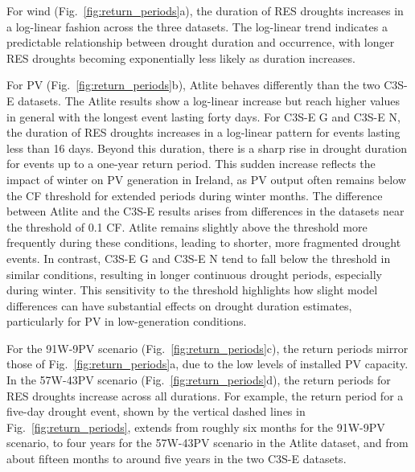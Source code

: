 \documentclass[preprint, 12pt, authoryear]{elsarticle}
\begin{document}
For wind (Fig.~\ref{fig:return_periods}a), the duration of RES droughts increases in a log-linear fashion across the three datasets. The log-linear trend indicates a predictable relationship between drought duration and occurrence, with longer RES droughts becoming exponentially less likely as duration increases. 

For PV (Fig.~\ref{fig:return_periods}b), Atlite behaves differently than the two C3S-E datasets. The Atlite results show a log-linear increase but reach higher values in general with the longest event lasting forty days. For C3S-E G and C3S-E N, the duration of RES droughts increases in a log-linear pattern for events lasting less than 16 days. Beyond this duration, there is a sharp rise in drought duration for events up to a one-year return period. This sudden increase reflects the impact of winter on PV generation in Ireland, as PV output often remains below the CF threshold for extended periods during winter months. The difference between Atlite and the C3S-E results arises from differences in the datasets near the threshold of 0.1 CF. Atlite remains slightly above the threshold more frequently during these conditions, leading to shorter, more fragmented drought events. In contrast, C3S-E G and C3S-E N tend to fall below the threshold in similar conditions, resulting in longer continuous drought periods, especially during winter. This sensitivity to the threshold highlights how slight model differences can have substantial effects on drought duration estimates, particularly for PV in low-generation conditions.

For the 91W-9PV scenario (Fig.~\ref{fig:return_periods}c), the return periods mirror those of Fig.~\ref{fig:return_periods}a, due to the low levels of installed PV capacity. In the 57W-43PV scenario (Fig.~\ref{fig:return_periods}d), the return periods for RES droughts increase across all durations. For example, the return period for a five-day drought event, shown by the vertical dashed lines in Fig.~\ref{fig:return_periods}, extends from roughly six months for the 91W-9PV scenario, to four years for the 57W-43PV scenario in the Atlite dataset, and from about fifteen months to around five years in the two C3S-E datasets.
\end{document}
